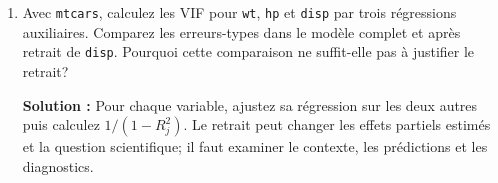 \documentclass[letterpaper,11pt]{article}
\newcommand{\prof}[1]{\ifdefined\avecsolutions\par{\color{blue}\textbf{Solution :} #1}\par\fi}
\begin{document}
\begin{enumerate}[leftmargin=*,wide,label=\bfseries Exercice \arabic*:]
\prof{Le centrage déplace la référence et peut réduire la dépendance entre termes construits, mais n'enlève pas une redondance intrinsèque entre mesures. Le retrait change la question et peut introduire un biais d'omission. Ridge conserve les variables avec une pénalité quadratique; la régression sur composantes utilise des directions orthogonales et un choix de dimension. Les deux dernières méthodes peuvent introduire un biais pour réduire la variance.}
\item Avec \texttt{mtcars}, calculez les VIF pour \texttt{wt}, \texttt{hp} et \texttt{disp} par trois régressions auxiliaires. Comparez les erreurs-types dans le modèle complet et après retrait de \texttt{disp}. Pourquoi cette comparaison ne suffit-elle pas à justifier le retrait?
\prof{Pour chaque variable, ajustez sa régression sur les deux autres puis calculez $1/(1-R_j^2)$. Le retrait peut changer les effets partiels estimés et la question scientifique; il faut examiner le contexte, les prédictions et les diagnostics.}
\end{enumerate}
\end{document}
